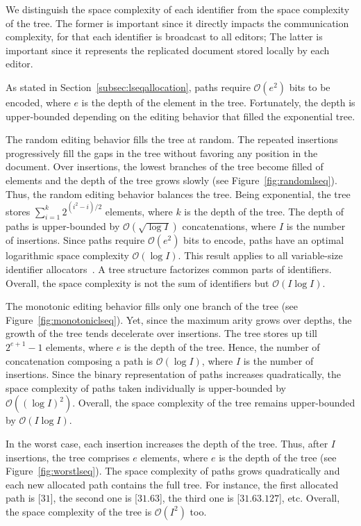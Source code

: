We distinguish the space complexity of each identifier from the space complexity
of the tree. The former is important since it directly impacts the communication
complexity, for that each identifier is broadcast to all editors; The latter is
important since it represents the replicated document stored locally by each
editor.

As stated in Section~\ref{subsec:lseqallocation}, paths
require $\mathcal{O}(e^2)$ bits to be encoded,
where $e$ is the depth of the element in the tree. Fortunately, the depth is
upper-bounded depending on the editing behavior that filled the exponential
tree.

The random editing behavior fills the tree at random. The repeated insertions
progressively fill the gaps in the tree without favoring any position in the
document. Over insertions, the lowest branches of the tree become filled of
elements and the depth of the tree grows slowly (see
Figure~\ref{fig:randomlseq}). Thus, the random editing behavior balances the
tree. Being exponential, the tree stores
$\textstyle\sum\nolimits_{i=1}^{k}{2^{(i^2-i)/2}}$ elements, where $k$ is the
depth of the tree. The depth of paths is upper-bounded by
$\mathcal{O}(\sqrt{\log I})$ concatenations, where $I$ is the number of
insertions. Since paths require $\mathcal{O}(e^2)$ bits to encode, paths have an
optimal logarithmic space complexity $\mathcal{O}(\log I)$. This result applies
to all variable-size identifier allocators~\cite{preguica2009commutative,
  weiss2009logoot}. A tree structure factorizes common parts of
identifiers. Overall, the space complexity is not the sum of identifiers but
$\mathcal{O}(I\log I)$.

The monotonic editing behavior fills only one branch of the tree (see
Figure~\ref{fig:monotoniclseq}). Yet, since the maximum arity grows over depths, the
growth of the tree tends decelerate over insertions. The tree stores up till
$2^{e+1}-1$ elements, where $e$ is the depth of the tree. Hence, the number of
concatenation composing a path is $\mathcal{O}(\log I)$, where $I$ is the number
of insertions. Since the binary representation of paths increases quadratically,
the space complexity of paths taken individually is upper-bounded by
$\mathcal{O}((\log I)^2)$.  Overall, the space complexity of the tree remains
upper-bounded by $\mathcal{O}(I\log I)$.

In the worst case, each insertion increases the depth of the tree. Thus, after
$I$ insertions, the tree comprises $e$ elements, where $e$ is the depth of the
tree (see Figure~\ref{fig:worstlseq}). The space complexity of paths grows
quadratically and each new allocated path contains the full tree. For instance,
the first allocated path is [$31$], the second one is [$31.63$], the third one
is [$31.63.127$], etc.  Overall, the space complexity of the tree is
$\mathcal{O}(I^2)$ too.

